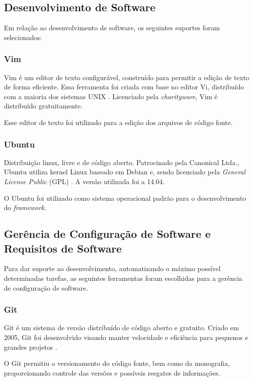 \begin{apendicesenv}
\subsection{Desenvolvimento de Software}
Em relação ao desenvolvimento de software, os seguintes suportes foram selecionados:

\subsubsection{Vim}
Vim é um editor de texto configurável, construído para permitir a edição de texto de forma eficiente. Essa ferramenta foi criada com base no editor Vi, distribuído com a maioria dos sistemas UNIX \cite{vim}. Licenciado pela \textit{charityware}, Vim é distribuído gratuitamente. 
\par
\indent Esse editor de texto foi utilizado para a edição dos arquivos de código fonte.

\subsubsection{Ubuntu}
Distribuição linux, livre e de código aberto. Patrocinado pela Canonical Ltda., Ubuntu utiliza kernel Linux baseado em Debian e, sendo licenciado pela \textit{General License Public} (GPL) \cite{ubuntu2010}. A versão utilizada foi a 14.04.
\par
\indent O Ubuntu foi utilizado como sistema operacional padrão para o desenvolvimento do \textit{framework}.

\subsection{Gerência de Configuração de Software e Requisitos de Software}
Para dar suporte ao desenvolvimento, automatizando o máximo possível determinadas tarefas, as seguintes ferramentas foram escolhidas para a gerência de configuração de software.

\subsubsection{Git}
Git é um sistema de versão distribuído de código aberto e gratuito. Criado em 2005, Git foi desenvolvido visando manter velocidade e eficiência para pequenos e grandes projetos \cite{git2015}. 
\par
\indent O Git permitiu o versionamento do código fonte, bem como da monografia, proporcionando controle das versões e possíveis resgates de informações.


\end{apendicesenv}
